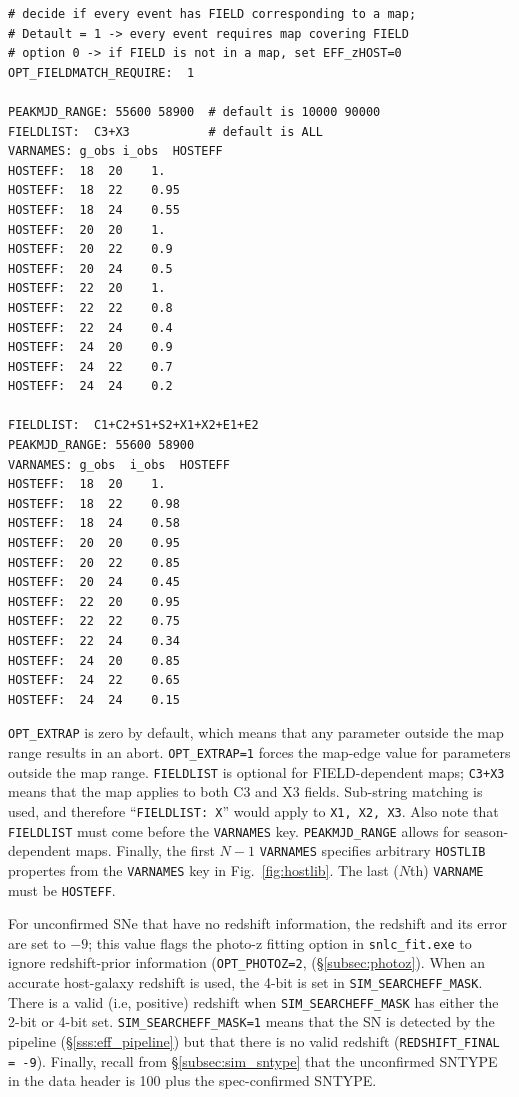 \documentclass[12pt]{article}
\begin{document}
{\begin{Verbatim}[frame=single]
# decide if every event has FIELD corresponding to a map;
# Detault = 1 -> every event requires map covering FIELD
# option 0 -> if FIELD is not in a map, set EFF_zHOST=0
OPT_FIELDMATCH_REQUIRE:  1  

PEAKMJD_RANGE: 55600 58900  # default is 10000 90000
FIELDLIST:  C3+X3           # default is ALL
VARNAMES: g_obs i_obs  HOSTEFF
HOSTEFF:  18  20    1.
HOSTEFF:  18  22    0.95
HOSTEFF:  18  24    0.55
HOSTEFF:  20  20    1.
HOSTEFF:  20  22    0.9
HOSTEFF:  20  24    0.5
HOSTEFF:  22  20    1.
HOSTEFF:  22  22    0.8
HOSTEFF:  22  24    0.4
HOSTEFF:  24  20    0.9
HOSTEFF:  24  22    0.7
HOSTEFF:  24  24    0.2

FIELDLIST:  C1+C2+S1+S2+X1+X2+E1+E2
PEAKMJD_RANGE: 55600 58900 
VARNAMES: g_obs  i_obs  HOSTEFF
HOSTEFF:  18  20    1.
HOSTEFF:  18  22    0.98
HOSTEFF:  18  24    0.58
HOSTEFF:  20  20    0.95
HOSTEFF:  20  22    0.85
HOSTEFF:  20  24    0.45
HOSTEFF:  22  20    0.95
HOSTEFF:  22  22    0.75
HOSTEFF:  22  24    0.34
HOSTEFF:  24  20    0.85
HOSTEFF:  24  22    0.65
HOSTEFF:  24  24    0.15
\end{Verbatim} 
%
{\tt OPT\_EXTRAP} is zero by default, which means that any 
parameter outside the map range results in an abort.
{\tt OPT\_EXTRAP=1} forces the map-edge value for parameters outside 
the map range. {\tt FIELDLIST} is optional for FIELD-dependent maps;
{\tt C3+X3} means that the map applies to both C3 and X3 fields.
Sub-string matching is used, and therefore ``{\tt FIELDLIST: X}'' 
would apply to {\tt X1, X2, X3}.
Also note that {\tt FIELDLIST} must come before the {\tt VARNAMES} key.
{\tt PEAKMJD\_RANGE} allows for season-dependent maps.
Finally, the first $N-1$ {\tt VARNAMES} specifies arbitrary
{\tt HOSTLIB} propertes from the {\tt VARNAMES} key in 
Fig.~\ref{fig:hostlib}. The last ($N$th) {\tt VARNAME} must be {\tt HOSTEFF}.


\clearpage
For unconfirmed SNe that have no redshift information,
the redshift and its error are set to $-9$; 
this value flags the photo-z fitting option in {\tt snlc\_fit.exe}
to ignore redshift-prior information
({\tt OPT\_PHOTOZ=2}, (\S\ref{subsec:photoz}).
When an accurate host-galaxy redshift is used, 
the 4-bit is set in {\tt SIM\_SEARCHEFF\_MASK}. 
There is a valid (i.e, positive) redshift when 
{\tt SIM\_SEARCHEFF\_MASK} has either the 2-bit or 4-bit set.
{\tt SIM\_SEARCHEFF\_MASK=1} means that the SN is
detected by the pipeline (\S\ref{sss:eff_pipeline})
but that there is no valid redshift
({\tt REDSHIFT\_FINAL = -9}).
Finally, recall from \S\ref{subsec:sim_sntype} 
that the unconfirmed SNTYPE in the data header is 
100 plus the spec-confirmed SNTYPE.


}
\end{document}
